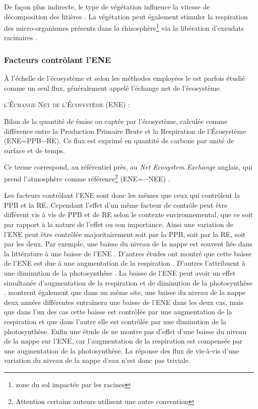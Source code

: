 De façon plus indirecte, le type de végétation influence la vitesse de décomposition des litières \citep{hobbie1996,liu2000,gogo2015}.
La végétation peut également stimuler la respiration des micro-organismes présents dans la rhizosphère\footnote{zone du sol impactée par les racines} via la libération d'exsudats racinaires \citep{moore2002}.

\subsubsection{Facteurs contrôlant l'ENE}

À l'échelle de l'écosystème et selon les méthodes employées le \coo est parfois étudié comme un seul flux, généralement appelé l'échange net de l'écosystème.

\begin{pdef}
\textsc{l'Échange Net de l'Écosystème (ENE)} :

Bilan de la quantité de \coo émise ou captée par l'écosystème, calculée comme  différence entre la Production Primaire Brute et la Respiration de l'Écosystème (ENE=PPB$-$RE).
Ce flux est exprimé en quantité de carbone par unité de surface et de temps.
\end{pdef}
Ce terme correspond, au référentiel près, au \textit{Net Ecosystem Exchange} anglais, qui prend l'atmosphère comme référence\footnote{Attention certains auteurs utilisent une autre convention} (ENE=$-$NEE) \citep{chapin2006}.

Les facteurs contrôlant l'ENE sont donc les mêmes que ceux qui contrôlent la PPB et la RE.
Cependant l'effet d'un même facteur de contrôle peut être différent vis à vis de PPB et de RE selon le contexte environnemental, que ce soit par rapport à la nature de l'effet ou son importance.
Ainsi une variation de l'ENE peut être contrôlée majoritairement soit par la PPB, soit par la RE, soit par les deux.
Par exemple, une baisse du niveau de la nappe est souvent liée dans la littérature à une baisse de l'ENE \plop.
D'autres études ont montré que cette baisse de l'ENE est due à une augmentation de la respiration \citep{alm1999, ise2008}.
D'autres l'attribuent à une diminution de la photosynthèse \citep{sonnentag2010,peichl2014}.
La baisse de l'ENE peut avoir un effet simultanée d'augmentation de la respiration et de diminution de la photosynthèse \citep{strack2013}.
\citet{lund2012} montrent également que dans un même site, une baisse du niveau de la nappe deux années différentes entraînera une baisse de l'ENE dans les deux cas, mais que dans l'un des cas cette baisse est contrôlée par une augmentation de la respiration et que dans l'autre elle est contrôlée par une diminution de la photosynthèse.
Enfin une étude de \citet{ballantyne2014} ne montre pas d'effet d'une baisse du niveau de la nappe sur l'ENE, car l'augmentation de la respiration est compensée par une augmentation de la photosynthèse.
La réponse des flux de \coo vis-à-vis d'une variation du niveau de la nappe d'eau n'est donc pas triviale.

